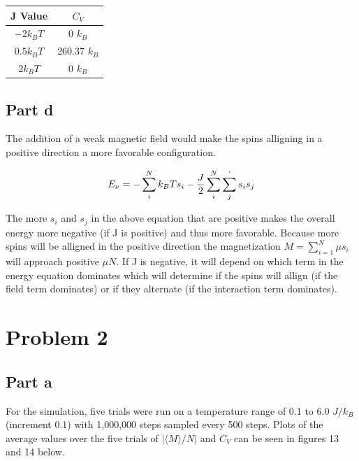 \documentclass{article}
\begin{document}
	\begin{center}
	\begin{tabular}{ c | c }

	J Value & $C_V$ \\
	\hline
	$-2 k_BT$ & 0 $k_B$ \\
	$0.5 k_BT$ & 260.37 $k_B$ \\
	$2 k_BT$ & 0 $k_B$ \\
	\hline

	\end{tabular}
	\end{center}


\subsection*{Part d}

	The addition of a weak magnetic field would make the spins alligning in a positive direction a more favorable configuration.

	\[ E_\nu = -\sum_i^N k_BTs_i - \frac{J}{2} \sum_i^N\sum_j^`s_is_j \]
	

	The more $s_i$ and $s_j$ in the above equation that are positive makes the overall energy more negative (if J is positive) and thus more favorable. Because more spins will be alligned in the positive direction the magnetization $M=\sum_{i=1}^N \mu s_i$ will approach positive $\mu N$. If J is negative, it will depend on which term in the energy equation dominates which will determine if the spins will allign (if the field term dominates) or if they alternate (if the interaction term dominates).

\newpage

\section*{Problem 2}

\subsection*{Part a}

	For the simulation, five trials were run on a temperature range of 0.1 to 6.0 $J/k_B$ (increment 0.1) with 1,000,000 steps sampled every 500 steps. Plots of the average values over the five trials of $|\langle M \rangle / N|$ and $C_V$ can be seen in figures 13 and 14 below.
\end{document}
